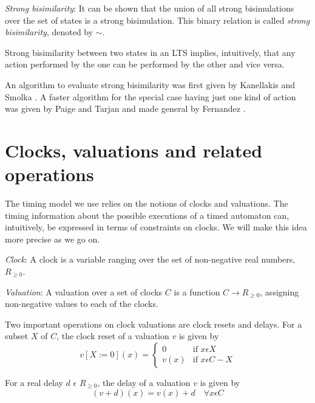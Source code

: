 \documentclass[a4paper]{llncs}
\begin{document}
\begin{definition}
  \emph{Strong bisimilarity}: It can be shown that the union of
  all strong bisimulations over the set of states is a strong
  bisimulation. This binary relation is called \textit{strong
    bisimilarity}, denoted by $\sim$.
\end{definition}

Strong bisimilarity between two states in an LTS implies,
intuitively, that any action performed by the one can be performed by
the other and vice versa.

An algorithm to evaluate strong bisimilarity was first given by
Kanellakis and Smolka \cite{kanellakis1990ccs}. A faster algorithm for
the special case having just one kind of action was given by Paige and
Tarjan \cite{paige1987three} and made general by Fernandez
\cite{fernandez1990implementation}.

\section{Clocks, valuations and related operations}

The timing model we use relies on the notions of clocks and
valuations. The timing information about the possible executions of a
timed automaton can, intuitively, be expressed in terms of constraints
on clocks. We will make this idea more precise as we go on.

\begin{definition}
\emph{Clock}: A clock is a variable ranging over the set of
non-negative real numbers, $R_{\geq 0}$.
\end{definition}

\begin{definition}
\emph{Valuation}: A valuation over a set of clocks $C$ is a
function $C \rightarrow R_{\geq 0}$, assigning non-negative values
to each of the clocks.
\end{definition}

Two important operations on clock valuations are clock resets and
delays. For a subset $X$ of $C$, the clock reset of a valuation $v$
is given by
\begin{displaymath}
  v[X:=0](x) = 
  \begin{cases}
    0    & \text{if } x \epsilon X \\
    v(x) & \text{if } x \epsilon C - X
  \end{cases}
\end{displaymath}

For a real delay $d$ $\epsilon$ $R_{\geq 0}$, the delay of a valuation
$v$ is given by
\begin{displaymath}
  (v + d)(x) = v(x) + d \quad \forall x \epsilon C
\end{displaymath}
\end{document}

